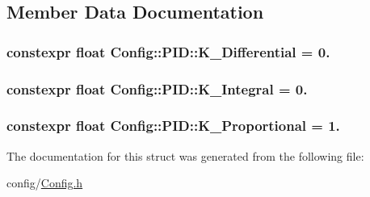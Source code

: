 \subsection{Member Data Documentation}
\hypertarget{struct_config_1_1_p_i_d_a074a795dbdbe8ac96de73a8a1c286b52}{
\subsubsection[{K\-\_\-\-Differential}]{\setlength{\rightskip}{0pt plus 5cm}constexpr float Config\-::\-P\-I\-D\-::\-K\-\_\-\-Differential = 0.\hspace{0.3cm}{\ttfamily [static]}}}\label{struct_config_1_1_p_i_d_a074a795dbdbe8ac96de73a8a1c286b52}
\hypertarget{struct_config_1_1_p_i_d_afbfd3025b20357a0e6f41004024bc8ed}{
\subsubsection[{K\-\_\-\-Integral}]{\setlength{\rightskip}{0pt plus 5cm}constexpr float Config\-::\-P\-I\-D\-::\-K\-\_\-\-Integral = 0.\hspace{0.3cm}{\ttfamily [static]}}}\label{struct_config_1_1_p_i_d_afbfd3025b20357a0e6f41004024bc8ed}
\hypertarget{struct_config_1_1_p_i_d_a16541f93ad6c39ab64df5c9798659ddf}{
\subsubsection[{K\-\_\-\-Proportional}]{\setlength{\rightskip}{0pt plus 5cm}constexpr float Config\-::\-P\-I\-D\-::\-K\-\_\-\-Proportional = 1.\hspace{0.3cm}{\ttfamily [static]}}}\label{struct_config_1_1_p_i_d_a16541f93ad6c39ab64df5c9798659ddf}


The documentation for this struct was generated from the following file\-:\begin{DoxyCompactItemize}
\item 
config/\hyperlink{_config_8h}{Config.\-h}\end{DoxyCompactItemize}

